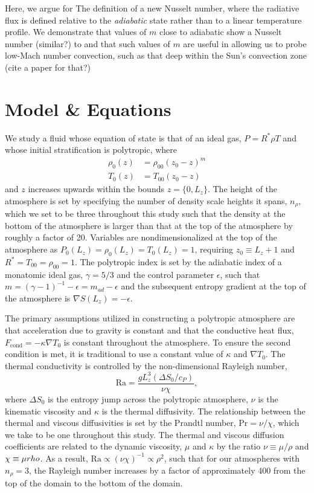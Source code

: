 \documentclass[aps, prl, twocolumn, groupedaddress]{revtex4-1}
\newcommand{\grad}{\ensuremath{\nabla}}
\begin{document}
Here, we argue for The definition of a new Nusselt number, where the radiative flux is defined relative to
the \emph{adiabatic} state rather than to a linear temperature profile.  We demonstrate that values
of $m$ close to adiabatic show a Nusselt number (similar?) to \cite{johnston&doering2009} and that
such values of $m$ are useful in allowing us to probe low-Mach number convection, such as that
deep within the Sun's convection zone (cite a paper for that?)


\section{Model \& Equations \label{section:model}}
We study a fluid whose equation of state is that of an ideal gas, $P = R^*\rho T$ and whose
initial stratification is polytropic, where
\begin{equation}
\begin{split}
\rho_0(z) &= \rho_{00}(z_0 - z)^m \\
T_0(z)    &= T_{00}(z_0 - z)
\label{eqn:polytrope}
\end{split}
\end{equation}
and $z$ increases upwards within the bounds $z =\{0, L_{z}\}$.
The height of the atmosphere is set by specifying the number of density scale heights it spans, $n_\rho$,
which we set to be three throughout this study such that the density at the bottom of the atmosphere is larger
than that at the top of the atmosphere by roughly a factor of 20.
Variables are nondimensionalized at the top of the atmosphere as 
$P_0(L_z) = \rho_0(L_z) = T_0(L_z) = 1$, requiring $z_0 \equiv L_z + 1$ and $R^* = T_{00} = \rho_{00} = 1$.  
The polytropic index is set by the adiabatic index of a monatomic ideal gas, $\gamma = 5/3$ and the 
control parameter $\epsilon$, such that $m = (\gamma - 1)^{-1} - \epsilon = m_{ad} - \epsilon$ 
and the subsequent entropy gradient at the top of the atmosphere is $\grad S(L_z) = -\epsilon$.

The primary assumptions utilized in constructing a polytropic atmosphere are that acceleration due to 
gravity is constant and that the conductive heat flux, $F_{\text{cond}} = -\kappa \grad T_0$ is
constant throughout the atmosphere.  To ensure the second condition is met, it is traditional to use
a constant value of $\kappa$ and $\grad T_0$.  The thermal conductivity is controlled by the
non-dimensional Rayleigh number,
\begin{equation}
\text{Ra} = \frac{g L_z^3 (\Delta S_0 / c_P)}{\nu\chi},
\end{equation}
where $\Delta S_0$ is the entropy jump across the polytropic atmosphere, $\nu$ is the kinematic viscosity
and $\kappa$ is the thermal diffusivity.  The relationship between the thermal and viscous diffusivities is
set by the Prandtl number, Pr$ = \nu/\chi$, which we take to be one throughout this study.   The thermal
and viscous diffusion coefficients are related to the dynamic viscosity, $\mu$ and $\kappa$ by the ratio
$\nu \equiv \mu/\rho$ and $\chi \equiv \mu\/rho$.  As a result, $\text{Ra} \propto (\nu\chi)^{-1} \propto
\rho^2$, such that for our atmospheres with $n_{\rho} = 3$, the Rayleigh number increases by a factor of
approximately 400 from the top of the domain to the bottom of the domain.
\end{document}
